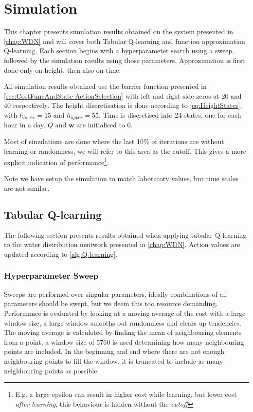 \chapter{Simulation}\label{chap:Simulation}

This chapter presents simulation results obtained on the system presented in \cref{chap:WDN} and will cover both Tabular Q-learning and function approximation Q-learning. Each section begins with a hyperparameter search using a sweep, followed by the simulation results using those parameters. Approximation is first done only on height, then also on time.

All simulation results obtained use the barrier function presented in \cref{sec:CostFuncAndState-ActionSelection} with left and right side zeros at 20 and 40 respectively. The height discretisation is done according to \cref{eq:HeightStates}, with $h_{lower} = 15$ and $h_{upper} = 55$. Time is discretised into 24 states, one for each hour in a day. $Q$ and $\textbf{w}$ are initialised to 0.

Most of simulations are done where the last 10$\%$ of iterations are without learning or randomness, we will refer to this area as the cutoff. This gives a more explicit indication of performance\footnote{E.g. a large epsilon can result in higher cost while learning, but lower cost \textit{after learning}, this behaviour is hidden without the \textit{cutoff}}.

Note we have setup the simulation to match laboratory values, but time scales are not similar.

\newpage \clearpage


\section{Tabular Q-learning}\label{sec:SimTabularQ}

The following section presents results obtained when applying tabular Q-learning to the water distribution nentwork presented in \cref{chap:WDN}. Action values are updated according to \cref{alg:Q-learning}.

\subsection{Hyperparameter Sweep}\label{sec:TabularHSweep}
Sweeps are performed over singular parameters, ideally combinations of all parameters should be swept, but we deem this too resource demanding. Performance is evaluated by looking at a moving average of the cost with a large window size, a large window smooths out randomness and clears up tendencies. The moving average is calculated by finding the mean of neighbouring elements from a point, a window size of 5760 is used determining how many neighbouring points are included. In the beginning and end where there are not enough neighbouring points to fill the window, it is truncated to include as many neighbouring points as possible.


